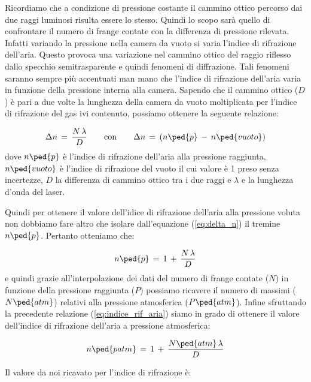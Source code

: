Ricordiamo che a condizione di pressione costante il cammino ottico percorso dai due raggi luminosi risulta essere lo stesso.
Quindi lo scopo sarà quello di confrontare il numero di frange contate con la differenza di pressione rilevata. Infatti variando la pressione nella camera da vuoto si varia l'indice di rifrazione dell'aria.
Questo provoca una variazione nel cammino ottico del raggio riflesso dallo specchio semitrasparente e quindi fenomeni di diffrazione.
Tali fenomeni saranno sempre più accentuati man mano che l'indice di rifrazione dell'aria varia in funzione della pressione interna alla camera.
Sapendo che il cammino ottico ($D$) è pari a due volte la lunghezza della camera da vuoto moltiplicata per l'indice di rifrazione del gas ivi contenuto, possiamo ottenere la seguente relazione:

\begin{equation}
	\Delta{n} \,=\, \frac{N \, \lambda}{D} \qquad \text{con} \qquad \Delta{n} \,=\, (n\ped{p} \,-\, n\ped{vuoto})
	\label{eq:delta_n}
\end{equation}
%
dove $n\ped{p}$ è l'indice di rifrazione dell'aria alla pressione raggiunta, $n\ped{vuoto}$ è l'indice di rifrazione del vuoto il cui valore è 1 preso senza incertezze, $D$ la differenza di cammino ottico tra i due raggi e $\lambda$ e la lunghezza d'onda del laser.

Quindi per ottenere il valore dell'idice di rifrazione dell'aria alla pressione voluta non dobbiamo fare altro che isolare dall'equazione (\ref{eq:delta_n}) il tremine $n\ped{p}$. Pertanto otteniamo che:

\begin{equation}
	n\ped{p} \,=\, 1 \,+\, \frac{N \, \lambda}{D}
	\label{eq:indice_rif_aria}
\end{equation}
%
e quindi grazie all'interpolazione dei dati del numero di frange contate ($N$) in funzione della pressione raggiunta ($P$) possiamo ricavere il numero di massimi ($N\ped{atm}$) relativi alla pressione atmosferica ($P\ped{atm}$).
Infine sfruttando la precedente relazione (\ref{eq:indice_rif_aria}) siamo in grado di ottenere il valore dell'indice di rifrazione dell'aria a pressione atmosferica:

\begin{equation}
	n\ped{patm} \,=\, 1 \,+\, \frac{N\ped{atm} \, \lambda}{D}
	\label{eq:indice_rif_aria_atm}
\end{equation}
%

Il valore da noi ricavato per l'indice di rifrazione è:

